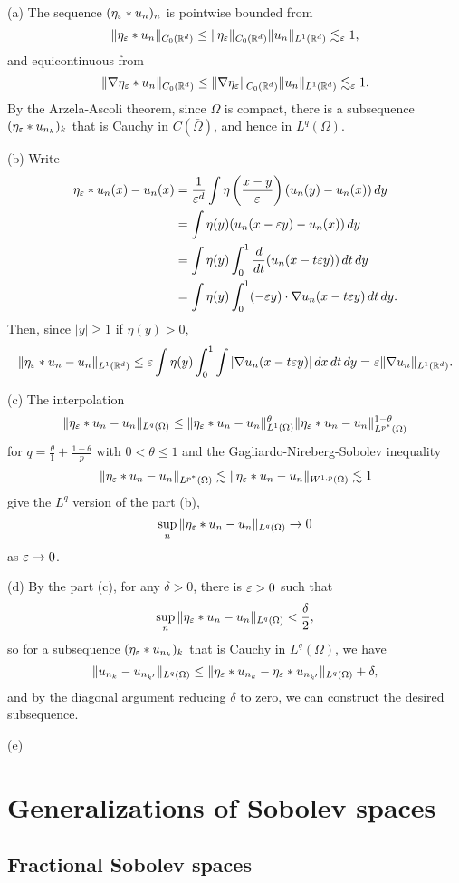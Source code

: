 \documentclass{../../large}
\begin{document}
\begin{pf}
(a)
The sequence $(\eta_\varepsilon*u_n)_n$ is pointwise bounded from
\[\|\eta_\varepsilon*u_n\|_{C_0(\mathbb{R}^d)}\le\|\eta_\varepsilon\|_{C_0(\mathbb{R}^d)}\|u_n\|_{L^1(\mathbb{R}^d)}\lesssim_\varepsilon1,\]
and equicontinuous from
\[\|\nabla\eta_\varepsilon*u_n\|_{C_0(\mathbb{R}^d)}\le\|\nabla\eta_\varepsilon\|_{C_0(\mathbb{R}^d)}\|u_n\|_{L^1(\mathbb{R}^d)}\lesssim_\varepsilon1.\]
By the Arzela-Ascoli theorem, since $\bar\Omega$ is compact, there is a subsequence $(\eta_\varepsilon*u_{n_k})_k$ that is Cauchy in $C(\bar\Omega)$, and hence in $L^q(\Omega)$.

(b)
Write
\begin{align*}
\eta_\e*u_n(x)-u_n(x)
&=\frac1{\e^d}\int\eta\left(\frac{x-y}\e\right)(u_n(y)-u_n(x))\,dy\\
&=\int\eta(y)(u_n(x-\e y)-u_n(x))\,dy\\
&=\int\eta(y)\int_0^1\dd{t}(u_n(x-t\e y))\,dt\,dy\\
&=\int\eta(y)\int_0^1(-\e y)\cdot\nabla u_n(x-t\e y)\,dt\,dy.
\end{align*}
Then, since $|y|\ge1$ if $\eta(y)>0$,
\[\|\eta_\varepsilon*u_n-u_n\|_{L^1(\mathbb{R}^d)}\le\varepsilon\int\eta(y)\int_0^1\int|\nabla u_n(x-t\varepsilon y)|\,dx\,dt\,dy=\varepsilon\|\nabla u_n\|_{L^1(\mathbb{R}^d)}.\]

(c)
The interpolation
\[\|\eta_\varepsilon*u_n-u_n\|_{L^q(\Omega)}\le\|\eta_\varepsilon*u_n-u_n\|_{L^1(\Omega)}^\theta\|\eta_\varepsilon*u_n-u_n\|_{L^{p^*}(\Omega)}^{1-\theta}\]
for $q=\frac\theta1+\frac{1-\theta}p$ with $0<\theta\le1$ and the Gagliardo-Nireberg-Sobolev inequality
\[\|\eta_\varepsilon*u_n-u_n\|_{L^{p^*}(\Omega)}\lesssim\|\eta_\varepsilon*u_n-u_n\|_{W^{1,p}(\Omega)}\lesssim1\]
give the $L^q$ version of the part (b),
\[\sup_n\|\eta_\varepsilon*u_n-u_n\|_{L^q(\Omega)}\to0\]
as $\varepsilon\to0$.

(d)
By the part (c), for any $\delta>0$, there is $\varepsilon>0$ such that
\[\sup_n\|\eta_\varepsilon*u_n-u_n\|_{L^q(\Omega)}<\frac\delta2,\]
so for a subsequence $(\eta_\varepsilon*u_{n_k})_k$ that is Cauchy in $L^q(\Omega)$, we have
\[\|u_{n_k}-u_{n_{k'}}\|_{L^q(\Omega)}\le\|\eta_\varepsilon*u_{n_k}-\eta_\varepsilon*u_{n_{k'}}\|_{L^q(\Omega)}+\delta,\]
and by the diagonal argument reducing $\delta$ to zero, we can construct the desired subsequence.

(e)
\end{pf}




\chapter{Generalizations of Sobolev spaces}
\section{Fractional Sobolev spaces}
\end{document}
